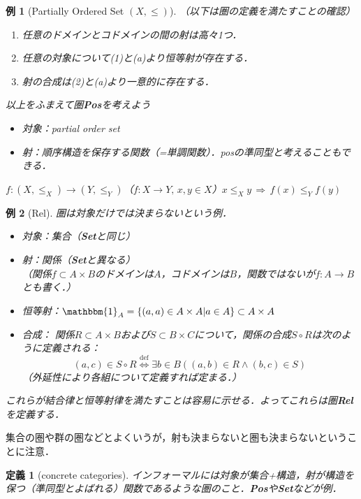 \documentclass[dvipdfmx,a4j,10pt]{jsarticle}
\theoremstyle{mystyle1}
\theoremstyle{mystyle2}
\newtheorem{dfn*}{定義}
\newtheorem{example}{例}
\renewcommand{\labelenumi}{\ensuremath{\blacksquare}}
\renewcommand{\labelenumi}{(\arabic{enumi})}%
\newcommand{\defLeftrightarrow}{\overset{\text{def}}{\iff}}
\begin{document}
\begin{example}[Partially Ordered Set $(X,\leq)$]
    （以下は圏の定義を満たすことの確認）
    \begin{enumerate}\renewcommand{\labelenumi}{(\alph{enumi})}
        \item 任意のドメインとコドメインの間の射は高々1つ．
        \item 任意の対象について(1)と(a)より恒等射が存在する．
        \item 射の合成は(2)と(a)より一意的に存在する．
    \end{enumerate}

    以上をふまえて圏\textbf{Pos}を考えよう
    \begin{itemize}
        \item 対象：partial order set
        \item 射：順序構造を保存する関数（=単調関数）．posの準同型と考えることもできる．
    \end{itemize}
    $f:(X,\leq_X)\to (Y,\leq_Y)$（$f:X\to Y,\, x,y\in X$）$x\leq_X y\,\Rightarrow\,f(x)\leq_Y f(y)$
\end{example}

\begin{example}[Rel]
    圏は対象だけでは決まらないという例．
    \begin{itemize}
        \item 対象：集合（\textbf{Set}と同じ）
        \item 射：関係（\textbf{Set}と異なる）\\
              （関係$f\subset A\times B$のドメインは$A$，コドメインは$B$，関数ではないが$f:A\to B$とも書く．）
        \item 恒等射：$\mathbbm{1}_A=\{(a,a)\in A\times A| a\in A\}\subset A\times A$
        \item 合成：
              関係$R\subset A\times B$および$S\subset B\times C$について，関係の合成$S\circ R$は次のように定義される：
              \[
                  (a,c)\in S\circ R \defLeftrightarrow \exists b\in B((a,b)\in R\land (b,c)\in S)
              \]
              （外延性により各組について定義すれば定まる．）
    \end{itemize}
    これらが結合律と恒等射律を満たすことは容易に示せる．よってこれらは圏\textbf{Rel}を定義する．
\end{example}

集合の圏や群の圏などとよくいうが，射も決まらないと圏も決まらないということに注意．

\begin{dfn*}[concrete categories]
    インフォーマルには対象が集合+構造，射が構造を保つ（準同型とよばれる）関数であるような圏のこと．\textbf{Pos}や\textbf{Set}などが例．
\end{dfn*}
\end{document}

